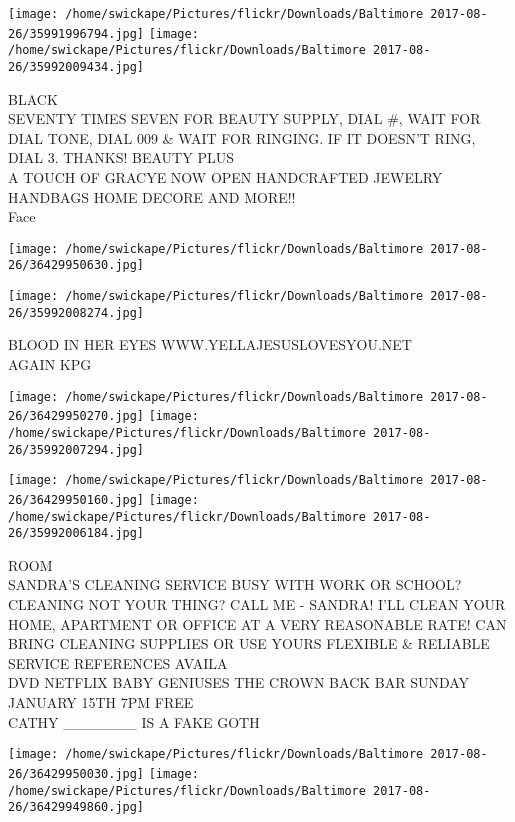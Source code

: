 \documentclass[10pt,letterpaper]{article}
\begin{document}
\texttt{[image: /home/swickape/Pictures/flickr/Downloads/Baltimore 2017-08-26/35991996794.jpg]}
\texttt{[image: /home/swickape/Pictures/flickr/Downloads/Baltimore 2017-08-26/35992009434.jpg]}

BLACK\\
SEVENTY TIMES SEVEN FOR BEAUTY SUPPLY, DIAL \#, WAIT FOR DIAL TONE, DIAL 009 \& WAIT FOR RINGING.  IF IT DOESN'T RING, DIAL 3.  THANKS!  BEAUTY PLUS\\
A TOUCH OF GRACYE NOW OPEN HANDCRAFTED JEWELRY HANDBAGS HOME DECORE AND MORE!!\\
Face\\
\pagebreak

\texttt{[image: /home/swickape/Pictures/flickr/Downloads/Baltimore 2017-08-26/36429950630.jpg]}

\vspace{0.25in}
\texttt{[image: /home/swickape/Pictures/flickr/Downloads/Baltimore 2017-08-26/35992008274.jpg]}

BLOOD IN HER EYES WWW.YELLAJESUSLOVESYOU.NET\\
AGAIN KPG\\
\pagebreak

\texttt{[image: /home/swickape/Pictures/flickr/Downloads/Baltimore 2017-08-26/36429950270.jpg]}
\texttt{[image: /home/swickape/Pictures/flickr/Downloads/Baltimore 2017-08-26/35992007294.jpg]}

\texttt{[image: /home/swickape/Pictures/flickr/Downloads/Baltimore 2017-08-26/36429950160.jpg]}
\texttt{[image: /home/swickape/Pictures/flickr/Downloads/Baltimore 2017-08-26/35992006184.jpg]}

ROOM\\
SANDRA'S CLEANING SERVICE BUSY WITH WORK OR SCHOOL?  CLEANING NOT YOUR THING?  CALL ME {-} SANDRA!   I'LL CLEAN YOUR HOME, APARTMENT OR OFFICE AT A VERY REASONABLE RATE!  CAN BRING CLEANING SUPPLIES OR USE YOURS FLEXIBLE \& RELIABLE SERVICE REFERENCES AVAILA\\
DVD NETFLIX BABY GENIUSES THE CROWN BACK BAR SUNDAY JANUARY 15TH 7PM FREE\\
CATHY \_\_\_\_\_\_\_ IS A FAKE GOTH\\
\pagebreak

\texttt{[image: /home/swickape/Pictures/flickr/Downloads/Baltimore 2017-08-26/36429950030.jpg]}
\texttt{[image: /home/swickape/Pictures/flickr/Downloads/Baltimore 2017-08-26/36429949860.jpg]}
\end{document}
